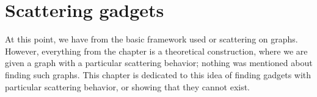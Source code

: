 \documentclass[../thesis-main/thesis-main]{subfiles}
\begin{document}
\chapter{Scattering gadgets}
\label{chap:scattering_gadgets}

At this point, we have from  the basic framework used or scattering on graphs.  However, everything from the chapter is a theoretical construction, where we are given a graph with a particular scattering behavior; nothing was mentioned about finding such graphs.  This chapter is dedicated to this idea of finding gadgets with particular scattering behavior, or showing that they cannot exist.


%
%
%
%
%
%
%
\end{document}
